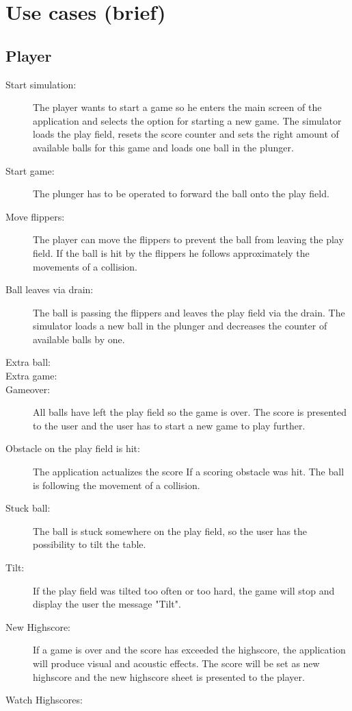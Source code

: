 \documentclass[fontsize=12pt,
               paper=a4,
               twoside=false,
               parskip=half,
               ]{scrartcl}
\begin{document}


\section{Use cases (brief)}

\subsection{Player}

\begin{description}

\item[Start simulation:]   The player wants to start a game so he enters the main screen of the application and selects the option for starting a new game. The simulator loads the play field, resets the score counter and sets the right amount of available balls for this game and loads one ball in the plunger.

\item[Start game:] The plunger has to be operated to forward the ball onto the play field. 

\item[Move flippers:] The player can move the flippers to prevent the ball from leaving the play field. If the ball is hit by the flippers he follows approximately the movements of a collision.

\item[Ball leaves via drain:] The ball is passing the flippers and leaves the play field via the drain. The simulator loads a new ball in the plunger and decreases the counter of available balls by one.

\item[Extra ball:] 

\item[Extra game:]

\item[Gameover:] All balls have left the play field so the game is over. The score is presented to the user and the user has to start a new game to play further.

\item[Obstacle on the play field is hit:] The application actualizes the score If a scoring obstacle  was hit. The ball is following the movement of a collision.

\item[Stuck ball:] The ball is stuck somewhere on the play field, so the user has the possibility to tilt the table.

\item[Tilt:] If the play field was tilted too often or too hard, the game will stop and display the user the message "Tilt".

\item[New Highscore:] If a game is over and the score has exceeded the highscore, the application will produce visual and acoustic effects. The score will be set as new highscore and the new highscore sheet is presented to the player.

\item[Watch Highscores:] 

\end{description}
\end{document}

